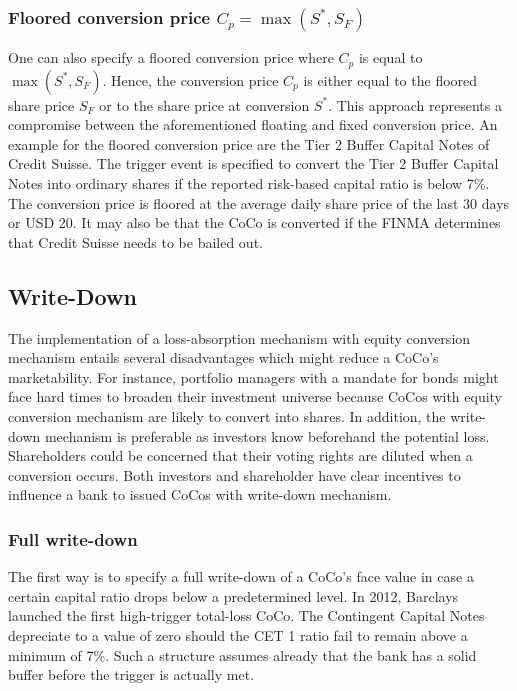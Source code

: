 \subsubsection*{Floored conversion price $C_p = \max\left( S^*, S_F \right)$}
One can also specify a floored conversion price where $C_p$ is equal to $\max\left( S^*, S_F \right)$. Hence, the conversion price $C_p$ is either equal to the floored share price $S_F$ or to the share price at conversion $S^*$. This approach represents a compromise between the aforementioned floating and fixed conversion price. \citep{de2014handbook} An example for the floored conversion price are the Tier 2 Buffer Capital Notes of Credit Suisse. %
The trigger event is specified to convert the Tier 2 Buffer Capital Notes into ordinary shares if the reported risk-based capital ratio is below 7\%. The conversion price is floored at the average daily share price of the last 30 days or USD 20. It may also be that the CoCo is converted if the FINMA determines that Credit Suisse needs to be bailed out. \citep{creditsuisse2011}

\subsection{Write-Down}
The implementation of a loss-absorption mechanism with equity conversion mechanism entails several disadvantages which might reduce a CoCo's marketability. For instance, portfolio managers with a mandate for bonds might face hard times to broaden their investment universe because CoCos with equity conversion mechanism are likely to convert into shares. In addition, the write-down mechanism is preferable as investors know beforehand the potential loss. Shareholders could be concerned that their voting rights are diluted when a conversion occurs. Both investors and shareholder have clear incentives to influence a bank to issued CoCos with write-down mechanism.  

\subsubsection*{Full write-down}
The first way is to specify a full write-down of a CoCo's face value in case a certain capital ratio drops below a predetermined level. \citep{de2014handbook} In 2012, Barclays launched the first high-trigger total-loss CoCo. The Contingent Capital Notes depreciate to a value of zero should the CET 1 ratio fail to remain above a minimum of 7\%. Such a structure assumes already that the bank has a solid buffer before the trigger is actually met. \citep{barclays2010}


